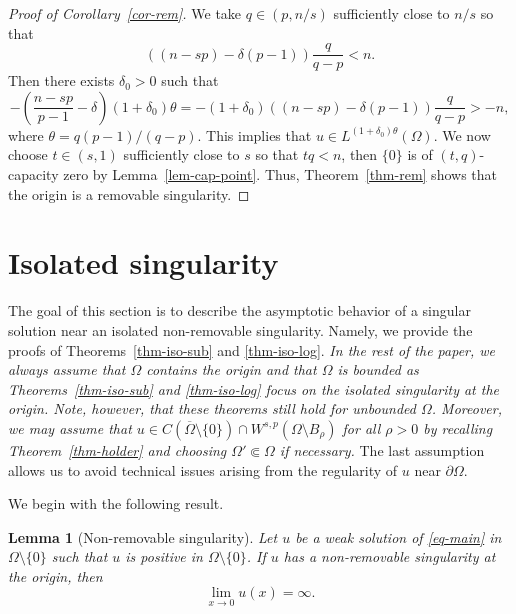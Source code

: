 \documentclass[11pt]{amsart}
\theoremstyle{plain}
\newtheorem{lemma}[theorem]{Lemma}
\theoremstyle{definition}
\numberwithin{equation}{section}
\begin{document}
\begin{proof}[Proof of Corollary~\ref{cor-rem}]
We take $q \in (p, n/s)$ sufficiently close to $n/s$ so that
		\begin{equation*}
			((n-sp)-\delta(p-1)) \frac{q}{q-p}<n.
		\end{equation*}
		Then there exists $\delta_0>0$ such that
		\begin{equation*}
			-\left(\frac{n-sp}{p-1}-\delta\right)(1+\delta_0) \theta=-(1+\delta_0)	\left((n-sp)-\delta(p-1)\right) \frac{q}{q-p}>-n,
		\end{equation*}
		where $\theta=q(p-1)/(q-p)$. This implies that $u \in L^{(1+\delta_0)\theta}(\Omega)$. We now choose $t \in (s, 1)$ sufficiently close to $s$ so that $tq<n$, then $\{0\}$ is of $(t, q)$-capacity zero by Lemma~\ref{lem-cap-point}. Thus, Theorem~\ref{thm-rem} shows that the origin is a removable singularity.
\end{proof}

\section{Isolated singularity}\label{sec-isolated}

The goal of this section is to describe the asymptotic behavior of a singular solution near an isolated non-removable singularity. Namely, we provide the proofs of Theorems~\ref{thm-iso-sub} and \ref{thm-iso-log}. \emph{In the rest of the paper, we always assume that $\Omega$ contains the origin and that $\Omega$ is bounded as Theorems~\ref{thm-iso-sub} and \ref{thm-iso-log} focus on the isolated singularity at the origin. Note, however, that these theorems still hold for unbounded $\Omega$. Moreover, we may assume that $u \in C(\overline{\Omega} \setminus \{0\}) \cap W^{s,p}(\Omega \setminus B_{\rho})$ for all $\rho>0$ by recalling Theorem~\ref{thm-holder} and choosing $\Omega' \Subset \Omega$ if necessary.} The last assumption allows us to avoid technical issues arising from the regularity of $u$ near $\partial \Omega$.

We begin with the following result.

\begin{lemma}[Non-removable singularity]\label{lem-non-rem}
 Let $u$ be a weak solution of \eqref{eq-main} in $\Omega \setminus \{0\}$ such that $u$ is positive in $\Omega \setminus \{0\}$. If $u$ has a non-removable singularity at the origin, then
	\begin{equation*}
		\lim_{x \to 0}u(x)=\infty.
	\end{equation*}
\end{lemma}
\end{document}
